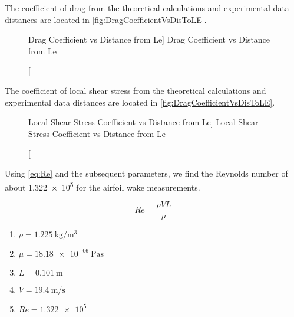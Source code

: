The coefficient of drag from the theoretical calculations and experimental data distances are located in  \autoref{fig:DragCoefficientVsDisToLE}. 

\begin{figure}[htpb]
    \centering
     
     \caption
     [Drag Coefficient vs Distance from Le]
     {Drag Coefficient vs Distance from Le}
     \label{fig:DragCoefficientVsDisToLE}
\end{figure}

The coefficient of local shear stress from the theoretical calculations and experimental data distances are located in  \autoref{fig:DragCoefficientVsDisToLE}. 

\begin{figure}[htpb]
    \centering
     
     \caption
     [Local Shear Stress Coefficient vs Distance from Le]
     {Local Shear Stress Coefficient vs Distance from Le}
     \label{fig:LocalShearStressVsDisToLE}
\end{figure}

Using \autoref{eq:Re} and the subsequent parameters, we find the Reynolds number of about \num{1.322e5} for the airfoil wake measurements.

\begin{equation}\label{eq:Re}
    Re = \frac{\rho V L}{\mu}
\end{equation}

\begin{enumerate}
    \item[] $\rho = \qty{1.225}{\kilogram\per\meter^3}$
    \item[] $\mu = \qty{18.18e-06}{\pascal\second}$
    \item[] $L = \qty{0.101}{\meter}$
    \item[] $V = \qty{19.4}{\meter\per\second}$
    \item[] $Re = \num{1.322e5}$
\end{enumerate}